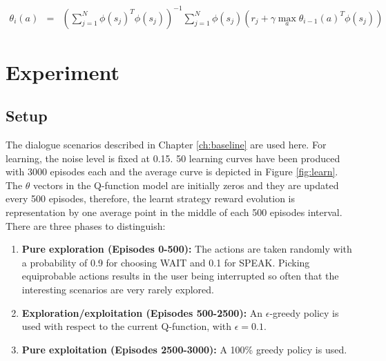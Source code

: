 				\begin{eqnarray}
					\theta_i (a) & = & (\sum_{j=1}^N \phi(s_j)^T \phi(s_j))^{-1} \sum_{j=1}^N \phi(s_j) (r_j + \gamma \max_a \theta_{i-1}(a)^T \phi(s_j))
				\end{eqnarray}

\section{Experiment}
	
    \subsection{Setup}

		The dialogue scenarios described in Chapter \ref{ch:baseline} are used here. For learning, the noise level is fixed at 0.15. 50 learning curves have been produced with 3000 episodes each and the average curve is depicted in Figure \ref{fig:learn}. The $\theta$ vectors in the Q-function model are initially zeros and they are updated every 500 episodes, therefore, the learnt strategy reward evolution is representation by one average point in the middle of each 500 episodes interval. There are three phases to distinguish:
        
        \begin{enumerate}
        	\item \textbf{Pure exploration (Episodes 0-500):} The actions are taken randomly with a probability of 0.9 for choosing WAIT and 0.1 for SPEAK. Picking equiprobable actions results in the user being interrupted so often that the interesting scenarios are very rarely explored.
            \item \textbf{Exploration/exploitation (Episodes 500-2500):} An $\epsilon$-greedy policy is used with respect to the current Q-function, with $\epsilon=0.1$.
            \item \textbf{Pure exploitation (Episodes 2500-3000):} A 100\% greedy policy is used.
        \end{enumerate}
				
